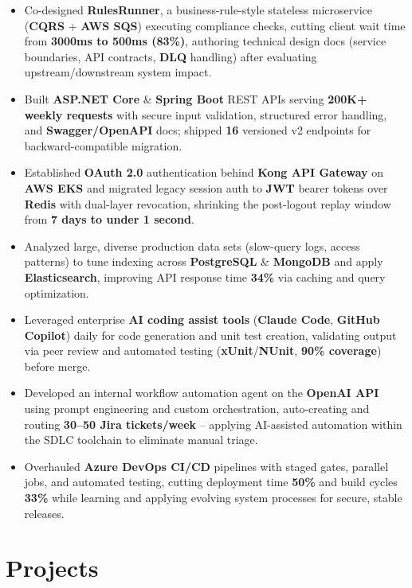 \documentclass[a4paper,10pt]{article}
\begin{document}
\begin{itemize}[leftmargin=*]
    \item Co-designed \textbf{RulesRunner}, a business-rule-style stateless microservice (\textbf{CQRS} + \textbf{AWS SQS}) executing compliance checks, cutting client wait time from \textbf{3000ms to 500ms (83\%)}, authoring technical design docs (service boundaries, API contracts, \textbf{DLQ} handling) after evaluating upstream/downstream system impact.
    \item Built \textbf{ASP.NET Core} \& \textbf{Spring Boot} REST APIs serving \textbf{200K+ weekly requests} with secure input validation, structured error handling, and \textbf{Swagger/OpenAPI} docs; shipped \textbf{16} versioned v2 endpoints for backward-compatible migration.
    \item Established \textbf{OAuth 2.0} authentication behind \textbf{Kong API Gateway} on \textbf{AWS EKS} and migrated legacy session auth to \textbf{JWT} bearer tokens over \textbf{Redis} with dual-layer revocation, shrinking the post-logout replay window from \textbf{7 days to under 1 second}.
    \item Analyzed large, diverse production data sets (slow-query logs, access patterns) to tune indexing across \textbf{PostgreSQL} \& \textbf{MongoDB} and apply \textbf{Elasticsearch}, improving API response time \textbf{34\%} via caching and query optimization.
    \item Leveraged enterprise \textbf{AI coding assist tools} (\textbf{Claude Code}, \textbf{GitHub Copilot}) daily for code generation and unit test creation, validating output via peer review and automated testing (\textbf{xUnit}/\textbf{NUnit}, \textbf{90\% coverage}) before merge.
    \item Developed an internal workflow automation agent on the \textbf{OpenAI API} using prompt engineering and custom orchestration, auto-creating and routing \textbf{30--50 Jira tickets/week} -- applying AI-assisted automation within the SDLC toolchain to eliminate manual triage.
    \item Overhauled \textbf{Azure DevOps CI/CD} pipelines with staged gates, parallel jobs, and automated testing, cutting deployment time \textbf{50\%} and build cycles \textbf{33\%} while learning and applying evolving system processes for secure, stable releases.
\end{itemize}

\section*{Projects}
\end{document}
